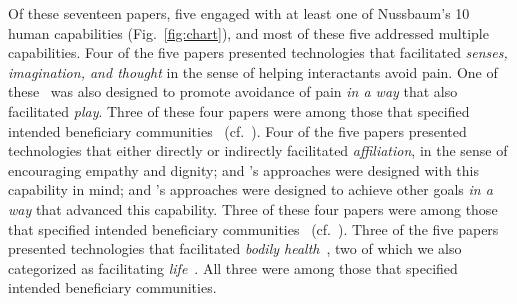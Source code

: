 \documentclass[letterpaper]{article} %
\begin{document}
Of these seventeen papers, five engaged with at least one of Nussbaum's 10 human capabilities (Fig.~\ref{fig:chart}), and most of these five addressed multiple capabilities.
%
Four of the five papers presented technologies that facilitated \textit{senses, imagination, and thought} in the sense of helping interactants avoid pain. One of these~\cite{foster2020towards} was also designed to promote avoidance of pain \textit{in a way} that also facilitated \textit{play}. Three of these four papers were among those that specified intended beneficiary communities~\cite{reneau2020supporting,foster2020towards,pourebadi2020stroke} (cf.~\citet{jeong2020face}).
Four of the five papers presented technologies that either directly or indirectly facilitated \textit{affiliation}, in the sense of encouraging empathy and dignity; \citet{pourebadi2020stroke} and \citet{jeong2020face}'s approaches were designed with this capability in mind; \citet{reneau2020supporting} and \citet{wilson2020knowledge}'s approaches were designed to achieve other goals \textit{in a way} that advanced this capability. Three of these four papers were among those that specified intended beneficiary communities~\cite{reneau2020supporting,wilson2020knowledge,pourebadi2020stroke} (cf.~\citet{jeong2020face}).
Three of the five papers presented technologies that facilitated \textit{bodily health}~\cite{reneau2020supporting,wilson2020knowledge,pourebadi2020stroke}, two of which we also categorized as facilitating \textit{life}~\cite{wilson2020knowledge,pourebadi2020stroke}. All three were among those that specified intended beneficiary communities.
\end{document}
